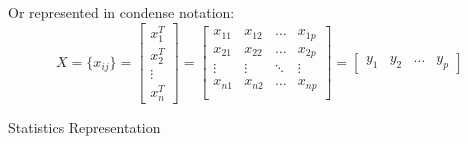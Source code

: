     Or represented in condense notation:
    \[
        X=\{x_{ij}\}=
        \begin{bmatrix}
            x_1^T\\x_2^T\\ \vdots \\ x_n^T
        \end{bmatrix}
        =
        \begin{bmatrix}
            x_{11}&x_{12}&\ldots&x_{1p}\\
            x_{21}&x_{22}&\ldots&x_{2p}\\
            \vdots&\vdots&\ddots&\vdots\\
            x_{n1}&x_{n2}&\ldots&x_{np}\\
        \end{bmatrix} 
        =
        \begin{bmatrix}
            y_1&y_2&\ldots &y_p
        \end{bmatrix}
    \]
\begin{point}
    \hypertarget{StatisticsRepresentation}{Statistics Representation}
\end{point}

